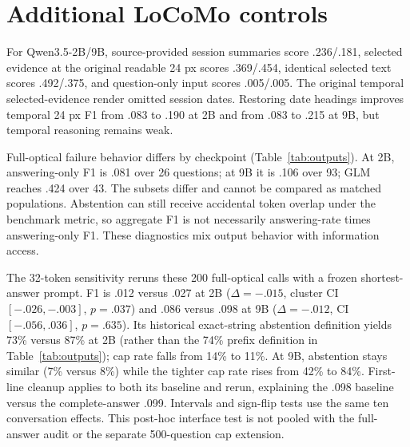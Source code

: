 \documentclass{article}
\begin{document}
\section{Additional LoCoMo controls}
\label{app:outputs}

For Qwen3.5-2B/9B, source-provided session summaries score .236/.181, selected evidence at the original readable 24 px scores .369/.454, identical selected text scores .492/.375, and question-only input scores .005/.005. The original temporal selected-evidence render omitted session dates. Restoring date headings improves temporal 24 px F1 from .083 to .190 at 2B and from .083 to .215 at 9B, but temporal reasoning remains weak.

\begin{table}[H]
  \centering\small
  \caption{Original LoCoMo-100 full-optical output diagnostics. Abstention is a normalized answer beginning with \texttt{No information available}; cap hits use generated-token counts. F1 conditional on answering is descriptive and selection-biased, not a decomposed causal estimate.}
  \label{tab:outputs}
  
\end{table}

Full-optical failure behavior differs by checkpoint (Table~\ref{tab:outputs}). At 2B, answering-only F1 is .081 over 26 questions; at 9B it is .106 over 93; GLM reaches .424 over 43. The subsets differ and cannot be compared as matched populations. Abstention can still receive accidental token overlap under the benchmark metric, so aggregate F1 is not necessarily answering-rate times answering-only F1. These diagnostics mix output behavior with information access.

The 32-token sensitivity reruns these 200 full-optical calls with a frozen shortest-answer prompt. F1 is .012 versus .027 at 2B ($\Delta=-.015$, cluster CI $[-.026,-.003]$, $p=.037$) and .086 versus .098 at 9B ($\Delta=-.012$, CI $[-.056,.036]$, $p=.635$). Its historical exact-string abstention definition yields 73\% versus 87\% at 2B (rather than the 74\% prefix definition in Table~\ref{tab:outputs}); cap rate falls from 14\% to 11\%. At 9B, abstention stays similar (7\% versus 8\%) while the tighter cap rate rises from 42\% to 84\%. First-line cleanup applies to both its baseline and rerun, explaining the .098 baseline versus the complete-answer .099. Intervals and sign-flip tests use the same ten conversation effects. This post-hoc interface test is not pooled with the full-answer audit or the separate 500-question cap extension.
\end{document}
